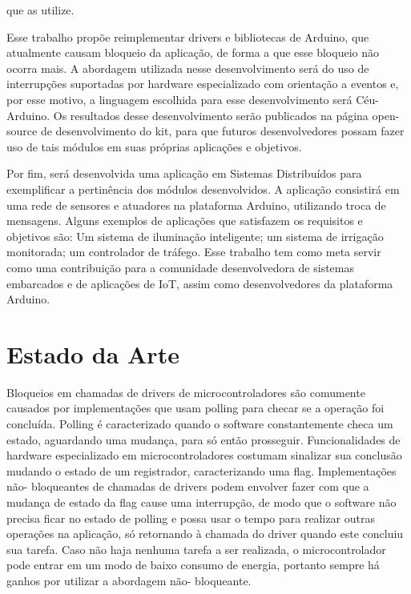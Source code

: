 \documentclass{article}
\begin{document}
que as utilize. \cite{githubceuarduino}
\par Esse trabalho propõe reimplementar drivers e bibliotecas de Arduino, que atualmente causam
bloqueio da aplicação, de forma a que esse bloqueio não ocorra mais. A abordagem utilizada nesse
desenvolvimento será do uso de interrupções suportadas por hardware especializado com orientação a
eventos e, por esse motivo, a linguagem escolhida para esse desenvolvimento será Céu-Arduino. Os
resultados desse desenvolvimento serão publicados na página open-source de desenvolvimento do
kit, para que futuros desenvolvedores possam fazer uso de tais módulos em suas próprias aplicações
e objetivos.
\par Por fim, será desenvolvida uma aplicação em Sistemas Distribuídos para exemplificar a pertinência
dos módulos desenvolvidos. A aplicação consistirá em uma rede de sensores e atuadores na
plataforma Arduino, utilizando troca de mensagens. Alguns exemplos de aplicações que satisfazem
os requisitos e objetivos são: Um sistema de iluminação inteligente; um sistema de irrigação
monitorada; um controlador de tráfego. Esse trabalho tem como meta servir como uma contribuição
para a comunidade desenvolvedora de sistemas embarcados e de aplicações de IoT, assim como
desenvolvedores da plataforma Arduino. \cite{wortmann2015} \cite{chui2010} \cite{edwards1997} \cite{githubceu} \cite{atmegadatasheet}

\section{Estado da Arte}

\tab Bloqueios em chamadas de drivers de microcontroladores são comumente causados por
implementações que usam polling para checar se a operação foi concluída. Polling é caracterizado
quando o software constantemente checa um estado, aguardando uma mudança, para só então
prosseguir. Funcionalidades de hardware especializado em microcontroladores costumam sinalizar sua
conclusão mudando o estado de um registrador, caracterizando uma flag. Implementações não-
bloqueantes de chamadas de drivers podem envolver fazer com que a mudança de estado da flag cause
uma interrupção, de modo que o software não precisa ficar no estado de polling e possa usar o tempo
para realizar outras operações na aplicação, só retornando à chamada do driver quando este concluiu
sua tarefa. Caso não haja nenhuma tarefa a ser realizada, o microcontrolador pode entrar em um
modo de baixo consumo de energia, portanto sempre há ganhos por utilizar a abordagem não-
bloqueante.
\end{document}
